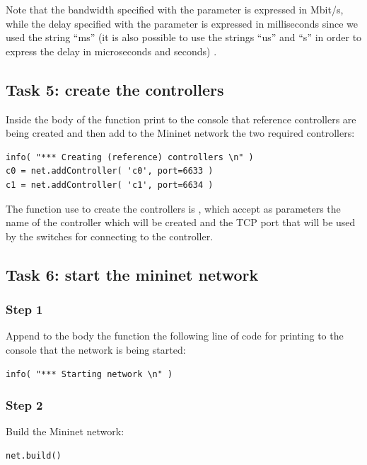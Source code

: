 Note that the bandwidth specified with the parameter  is expressed in
Mbit/s, while the delay specified with the parameter  is expressed
in milliseconds since we used the string ``ms'' (it is also possible to use
the strings ``us'' and ``s'' in order to express the delay in microseconds and
seconds) \cite{ref-7}.





\subsection*{Task 5: create the controllers}
Inside the body of the function  print to the console
that reference controllers are being created and then add to the Mininet network
the two required controllers:
\begin{lstlisting}
info( "*** Creating (reference) controllers \n" )
c0 = net.addController( 'c0', port=6633 )
c1 = net.addController( 'c1', port=6634 )
\end{lstlisting}

The function use to create the controllers is , which accept
as parameters the name of the controller which will be created and the TCP port that
will be used by the switches for connecting to the controller.







\subsection*{Task 6: start the mininet network}
\subsubsection*{Step 1}
Append to the body the function  the following line
of code for printing to the console that the network is being started:
\begin{lstlisting}
info( "*** Starting network \n" )
\end{lstlisting}

\subsubsection*{Step 2}
Build the Mininet network:
\begin{lstlisting}
net.build()
\end{lstlisting}


